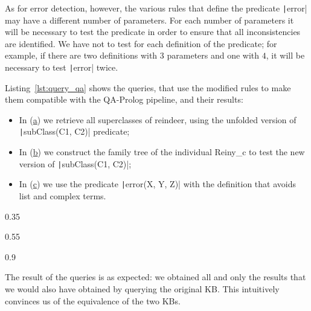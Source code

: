As for error detection, however, the various rules that define the predicate \texttt|error| may have a different number of parameters. For each number of parameters it will be necessary to test the predicate in order to ensure that all inconsistencies are identified. We have not to test for each definition of the predicate; for example, if there are two definitions with $3$ parameters and one with $4$, it will be necessary to test \texttt|error| twice.

Listing~\ref{lst:query_qa} shows the queries, that use the modified rules to make them compatible with the QA-Prolog pipeline, and their results:
\begin{itemize}
	\item In (\hyperref[lst:query_subclass]{a}) we retrieve all superclasses of reindeer, using the unfolded version of \texttt|subClass(C1, C2)| predicate;
	\item In (\hyperref[lst:query_ancestor]{b}) we construct the family tree of the individual Reiny\_c to test the new version of \texttt|subClass(C1, C2)|;
	\item In (\hyperref[lst:query_error]{c}) we use the predicate \texttt|error(X, Y, Z)| with the definition that avoids list and complex terms.
\end{itemize}

\begin{listing}[h]
	\centering
	\begin{sublisting}[c]{0.35\linewidth}
		\caption{Subclasses}
		\label{lst:query_subclass}
	\end{sublisting}
	\qquad
	\begin{sublisting}[c]{0.55\linewidth}
		\caption{Ancestor}
		\label{lst:query_ancestor}
	\end{sublisting}
	
	\vspace{.2cm}
	\begin{sublisting}[c]{0.9\linewidth}
		\caption{Error}
		\label{lst:query_error}
	\end{sublisting}
	\caption{Query results}
	\label{lst:query_qa}
\end{listing}

The result of the queries is as expected: we obtained all and only the results that we would also have obtained by querying the original KB. This intuitively convinces us of the equivalence of the two KBs.

